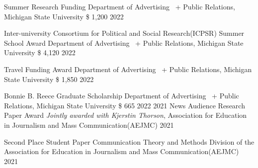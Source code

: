 \begin{cvhonors}

    \cvhonor
    {Summer Research Funding} %
    {Department of Advertising \ +  Public Relations, Michigan State University} %
    {\$ 1,200} %
    {2022} %
    
    \cvhonor
    { Inter-university Consortium for Political and Social Research(ICPSR) Summer School Award} %
    {Department of Advertising \ +  Public Relations, Michigan State University} %
    {\$ 4,120} %
    {2022} %
    
    \cvhonor
    {Travel Funding Award} %
    {Department of Advertising \ +  Public Relations, Michigan State University} %
    {\$ 1,850} %
    {2022} %
    
    \cvhonor
    {Bonnie B. Reece Graduate Scholarship} %
    {Department of Advertising \ +  Public Relations, Michigan State University} %
    {\$ 665} %
    {2022} %
    \cvhonor
    {2021 News Audience Research Paper Award} %
    { \textit{Jointly awarded with Kjerstin Thorson}, Association for Education in Journalism and Mass Communication(AEJMC) } %
    {} %
    {2021} %
    
    \cvhonor
    {Second Place Student Paper} %
    {Communication Theory and Methods Division of the Association for Education in Journalism and Mass Communication(AEJMC) } %
    {} %
    {2021} %
    

\end{cvhonors}
